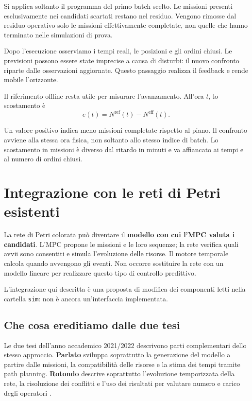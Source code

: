 \documentclass[a4paper,11pt]{article}
\begin{document}
Si applica soltanto il programma del primo batch scelto. Le missioni presenti esclusivamente nei candidati scartati restano nel residuo. Vengono rimosse dal residuo operativo solo le missioni effettivamente completate, non quelle che hanno terminato nelle simulazioni di prova.

Dopo l'esecuzione osserviamo i tempi reali, le posizioni e gli ordini chiusi. Le previsioni possono essere state imprecise a causa di disturbi: il nuovo confronto riparte dalle osservazioni aggiornate. Questo passaggio realizza il feedback e rende mobile l'orizzonte.

Il riferimento offline resta utile per misurare l'avanzamento. All'ora $t$, lo scostamento è
\begin{equation}
    e(t)=N^{\mathrm{ref}}(t)-N^{\mathrm{eff}}(t).
\end{equation}

Un valore positivo indica meno missioni completate rispetto al piano. Il confronto avviene alla stessa ora fisica, non soltanto allo stesso indice di batch. Lo scostamento in missioni è diverso dal ritardo in minuti e va affiancato ai tempi e al numero di ordini chiusi.

\section{Integrazione con le reti di Petri esistenti}
\label{sec:mpc-petri}

La rete di Petri colorata può diventare il \textbf{modello con cui l'MPC valuta i candidati}. L'MPC propone le missioni e le loro sequenze; la rete verifica quali avvii sono consentiti e simula l'evoluzione delle risorse. Il motore temporale calcola quando avvengono gli eventi. Non occorre sostituire la rete con un modello lineare per realizzare questo tipo di controllo predittivo.

L'integrazione qui descritta è una proposta di modifica dei componenti letti nella cartella \texttt{sim}: non è ancora un'interfaccia implementata.

\subsection{Che cosa ereditiamo dalle due tesi}

Le due tesi dell'anno accademico 2021/2022 descrivono parti complementari dello stesso approccio. \textbf{Parlato} sviluppa soprattutto la generazione del modello a partire dalle missioni, la compatibilità delle risorse e la stima dei tempi tramite path planning. \textbf{Rotondo} descrive soprattutto l'evoluzione temporizzata della rete, la risoluzione dei conflitti e l'uso dei risultati per valutare numero e carico degli operatori \cite[sezioni 2.3--2.5]{Parlato}\cite[sezioni 2.3--2.6]{Rotondo}.
\end{document}
